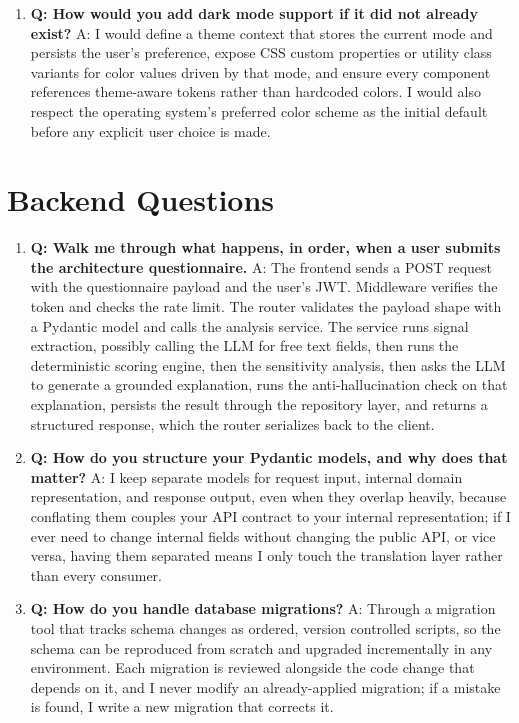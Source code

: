 \documentclass[11pt,a4paper]{report}
\begin{document}
\begin{enumerate}[leftmargin=*]
\item \textbf{Q: How would you add dark mode support if it did not already exist?}
A: I would define a theme context that stores the current mode and persists the user's preference, expose CSS custom properties or utility class variants for color values driven by that mode, and ensure every component references theme-aware tokens rather than hardcoded colors. I would also respect the operating system's preferred color scheme as the initial default before any explicit user choice is made.
\end{enumerate}

\section{Backend Questions}

\begin{enumerate}[leftmargin=*]
\item \textbf{Q: Walk me through what happens, in order, when a user submits the architecture questionnaire.}
A: The frontend sends a POST request with the questionnaire payload and the user's JWT. Middleware verifies the token and checks the rate limit. The router validates the payload shape with a Pydantic model and calls the analysis service. The service runs signal extraction, possibly calling the LLM for free text fields, then runs the deterministic scoring engine, then the sensitivity analysis, then asks the LLM to generate a grounded explanation, runs the anti-hallucination check on that explanation, persists the result through the repository layer, and returns a structured response, which the router serializes back to the client.

\item \textbf{Q: How do you structure your Pydantic models, and why does that matter?}
A: I keep separate models for request input, internal domain representation, and response output, even when they overlap heavily, because conflating them couples your API contract to your internal representation; if I ever need to change internal fields without changing the public API, or vice versa, having them separated means I only touch the translation layer rather than every consumer.

\item \textbf{Q: How do you handle database migrations?}
A: Through a migration tool that tracks schema changes as ordered, version controlled scripts, so the schema can be reproduced from scratch and upgraded incrementally in any environment. Each migration is reviewed alongside the code change that depends on it, and I never modify an already-applied migration; if a mistake is found, I write a new migration that corrects it.


\end{enumerate}
\end{document}
